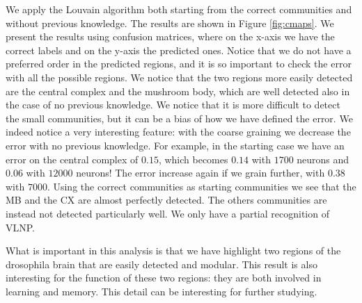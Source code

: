 We apply the Louvain algorithm both starting from the correct communities and without previous knowledge.
The results are shown in Figure \ref{fig:cmaps}. We present the results
using confusion matrices, where on the x-axis we have the correct labels
and on the y-axis the predicted ones. Notice that we do not have a preferred
order in the predicted regions, and it is so important to check the error with
all the possible regions. We notice that the two regions more easily
detected are the central complex and the mushroom body, which are well
detected also in the case of no previous knowledge. We notice that it is 
more difficult to detect the small communities, but it can be a bias of
how we have defined the error. We indeed notice a very interesting feature: 
with the coarse graining we decrease the error with no previous knowledge. For example, 
in the starting case we have an error on the central complex of $0.15$, which
becomes $0.14$ with $1700$ neurons and $0.06$ with $12000$ neurons! The error
increase again if we grain further, with $0.38$ with $7000$. Using the correct 
communities as starting communities we see that the MB and the CX are almost
perfectly detected. The others communities are instead not detected 
particularly well. We only have a partial recognition of VLNP.

What is important in this analysis is that we have highlight two regions
of the drosophila brain that are easily detected and modular. This result
is also interesting for the function of these two regions: they are both
involved in learning and memory. This detail can be interesting for further
studying. 